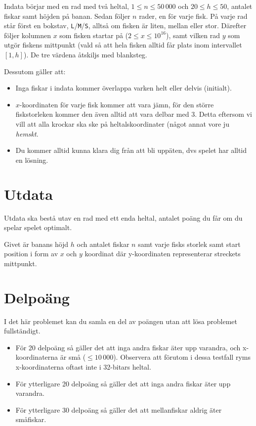 Indata börjar med en rad med två heltal, $1 \leq n \leq 50\,000$ och $20 \leq
h \leq 50$, antalet fiskar samt höjden på banan. Sedan följer $n$ rader,
en för varje fisk. På varje rad står först en bokstav, \texttt{L}/\texttt{M}/\texttt{S}, alltså om fisken är liten, mellan eller stor. Därefter följer kolumnen $x$ som fisken startar på ($2 \leq x \leq 10^{16}$), samt vilken rad $y$ som utgör fiskens mittpunkt (vald så att hela fisken alltid får plats inom intervallet $[1, h]$). De tre värdena åtskiljs med blanksteg.

Dessutom gäller att:
\begin{itemize}
  \item
    Inga fiskar i indata kommer överlappa varken helt eller delvis (initialt).
  \item
      $x$-koordinaten för varje fisk kommer att vara jämn, för den större
      fiskstorleken kommer den även alltid att vara delbar med 3. Detta
      eftersom vi vill att alla krockar ska ske på heltalskoordinater (något
      annat vore ju \emph{hemskt}.
  \item
    Du kommer alltid kunna klara dig från att bli uppäten, dvs spelet har
    alltid en lösning.
\end{itemize}

\section*{Utdata}
Utdata ska bestå utav en rad med ett enda heltal, antalet poäng du får om du spelar spelet optimalt.


Givet är banans höjd $h$ och antalet fiskar $n$ samt
varje fisks storlek samt start position i form av $x$ och $y$ koordinat där y-koordinaten
representerar streckets mittpunkt. 



\section*{Delpoäng}
I det här problemet kan du samla en del av poängen utan att lösa problemet fullständigt.

\begin{itemize}
    \item För 20 delpoäng så gäller det att inga andra fiskar äter upp
          varandra, och x-koordinaterna är små ($\leq 10\,000$). Observera att förutom i dessa testfall ryms x-koordinaterna oftast inte i 32-bitars heltal.
    \item För ytterligare 20 delpoäng så gäller det att inga andra fiskar
          äter upp varandra.
    \item För ytterligare 30 delpoäng så gäller det att mellanfiskar aldrig
          äter småfiskar.
\end{itemize}

